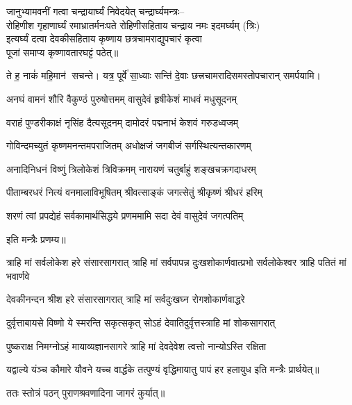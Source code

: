 \begin{center}
{जानुभ्यामवनीं गत्वा चन्द्रायार्घ्यं निवेदयेत्}
चन्द्रार्घ्यमन्त्रः–\\

{रोहिणीश गृहाणार्घ्यं रमाभ्रातर्मनःपते}
रोहिणीसहिताय चन्द्राय नमः इदमर्घ्यम् (त्रिः)\\

इत्यर्घ्यं दत्वा देवकीसहिताय कृष्णाय छत्रचामराद्युपचारं कृत्वा\\पूजां समाप्य कृष्णावतारघट्टं पठेत्॥

{ते ह॒ नाकं॑ महि॒मान॑ सचन्ते। यत्र॒ पूर्वे॑ सा॒ध्याः सन्ति॑ दे॒वाः}
\devAya{} छत्त्रचामरादिसमस्तोपचारान् समर्पयामि।\medskip

\twolineshloka
{अनघं वामनं शौरि वैकुण्ठं पुरुषोत्तमम्}
{वासुदेवं हृषीकेशं माधवं मधुसूदनम्}

\twolineshloka
{वराहं पुण्डरीकाक्षं नृसिंह दैत्यसूदनम्}
{दामोदरं पद्मनाभं केशवं गरुडध्वजम्}

\twolineshloka
{गोविन्दमच्युतं कृष्णमनन्तमपराजितम्}
{अधोक्षजं जगबीजं सर्गस्थित्यन्तकारणम्}

\twolineshloka
{अनादिनिधनं विष्णुं त्रिलोकेशं त्रिविक्रमम्}
{नारायणं चतुर्बाहुं शङ्खचक्रगदाधरम्}

\twolineshloka
{पीताम्बरधरं नित्यं वनमालाविभूषितम्}
{श्रीवत्साङ्कं जगत्सेतुं श्रीकृष्णं श्रीधरं हरिम्}

\twolineshloka
{शरणं त्वां प्रपद्येहं सर्वकामार्थसिद्धये}
{प्रणममामि सदा देवं वासुदेवं जगत्पतिम्}

इति मन्त्रैः प्रणम्य॥


\resetShloka
\threelineshloka
{त्राहि मां सर्वलोकेश हरे संसारसागरात्}
{त्राहि मां सर्वपापन्न दुःखशोकार्णवात्प्रभो}
{सर्वलोकेश्वर त्राहि पतितं मां भवार्णवे}

\twolineshloka
{देवकीनन्दन श्रीश हरे संसारसागरात्}
{त्राहि मां सर्वदुःखघ्न रोगशोकार्णवाद्धरे}

\twolineshloka
{दुर्वृत्ताबायसे विष्णो ये स्मरन्ति सकृत्सकृत्}
{सोऽहं देवातिदुर्वृत्तस्त्राहि मां शोकसागरात्}

\twolineshloka
{पुष्कराक्ष निमग्नोऽहं मायाव्यज्ञानसागरे}
{त्राहि मां देवदेवेश त्वत्तो नान्योऽस्ति रक्षिता}

\twolineshloka
{यद्वाल्ये यंञ्च कौमारे यौवने यच्च वार्द्धके}
{तत्पुण्यं वृद्धिमायातु पापं हर हलायुध}
इति मन्त्रैः प्रार्थयेत्॥

ततः स्तोत्रं पठन् पुराणश्रवणादिना जागरं कुर्यात्॥


\end{center}
